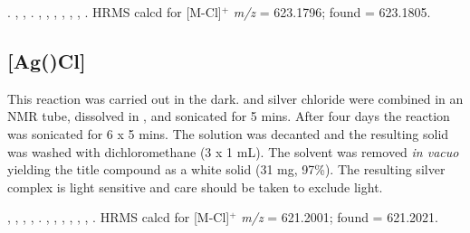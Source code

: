 \begin{sloppypar}
.
,
,
.
,
,
,
,
,
,
.
HRMS calcd for  [M-Cl]$^+$ \emph{m/z} = 623.1796; found = 623.1805.
\end{sloppypar}



\subsection*{[Ag(\tBusixantphos)Cl]}

This reaction was carried out in the dark.  \tBuSixantphos{} and silver chloride were combined in an NMR tube, dissolved in , and sonicated for 5 mins.  After four days the reaction was sonicated for 6 x 5 mins.  The solution was decanted and the resulting solid was washed with dichloromethane (3 x 1 mL).  The solvent was removed \emph{in vacuo} yielding the title compound as a white solid (31 mg, 97\%).  The resulting silver complex is light sensitive and care should be taken to exclude light.

\begin{sloppypar}
,
,
,
,
.
,
,
,
,
,
,
.
HRMS calcd for  [M-Cl]$^+$ \emph{m/z} = 621.2001; found = 621.2021.
\end{sloppypar}

